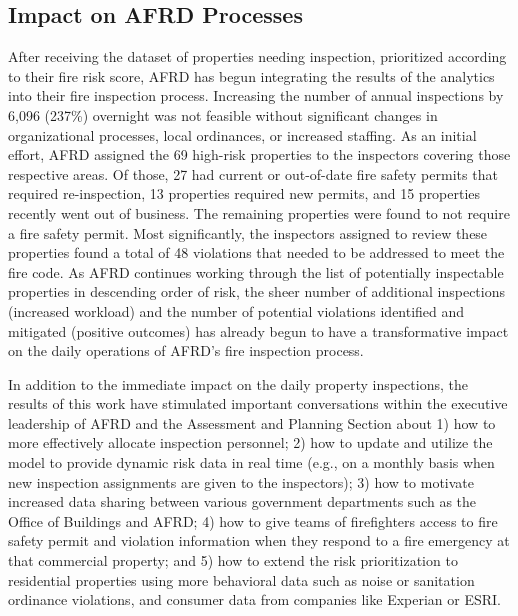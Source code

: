 \documentclass{sig-alternate-05-2015}
\begin{document}
{\subsection{Impact on AFRD Processes}
After receiving the dataset of properties needing inspection, prioritized according to their fire risk score, AFRD has begun integrating the results of the analytics into their fire inspection process. Increasing the number of annual inspections by 6,096 (237\%) overnight was not feasible without significant changes in organizational processes, local ordinances, or increased staffing. As an initial effort, AFRD assigned the 69 high-risk properties to the inspectors covering those respective areas. Of those, 27 had current or out-of-date fire safety permits that required re-inspection, 13 properties required new permits, and 15 properties recently went out of business. The remaining properties were found to not require a fire safety permit. Most significantly, the inspectors assigned to review these properties found a total of 48 violations that needed to be addressed to meet the fire code. As AFRD continues working through the list of potentially inspectable properties in descending order of risk, the sheer number of additional inspections (increased workload) and the number of potential violations identified and mitigated (positive outcomes) has already begun to have a transformative impact on the daily operations of AFRD's fire inspection process.

In addition to the immediate impact on the daily property inspections, the results of this work have stimulated important conversations within the executive leadership of AFRD and the Assessment and Planning Section about 1) how to more effectively allocate inspection personnel; 2) how to update and utilize the model to provide dynamic risk data in real time (e.g., on a monthly basis when new inspection assignments are given to the inspectors); 3) how to motivate increased data sharing between various government departments such as the Office of Buildings and AFRD; 4) how to give teams of firefighters access to fire safety permit and violation information when they respond to a fire emergency at that commercial property; and 5) how to extend the risk prioritization to residential properties using more behavioral data such as noise or sanitation ordinance violations, and consumer data from companies like Experian or ESRI.  

}
\end{document}
